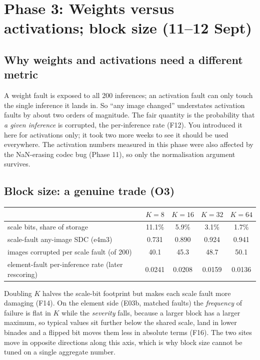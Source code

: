 \section{Phase 3: Weights versus activations; block size (11--12 Sept)}

\subsection{Why weights and activations need a different metric}
A weight fault is exposed to all 200 inferences; an activation fault can only touch the single inference it lands in. So ``any image changed'' understates activation faults by about two orders of magnitude. The fair quantity is the probability that \emph{a given inference} is corrupted, the per-inference rate (F12).
You introduced it here for activations only; it took two more weeks to see it should be used everywhere. The activation numbers measured in this phase were also affected by the NaN-erasing codec bug (Phase 11), so only the normalisation argument survives.

\subsection{Block size: a genuine trade (O3)}
\begin{center}
\small
\begin{tabular}{lcccc}
\toprule
 & $K=8$ & $K=16$ & $K=32$ & $K=64$ \\
\midrule
scale bits, share of storage & 11.1\% & 5.9\% & 3.1\% & 1.7\% \\
scale-fault any-image SDC (e4m3) & 0.731 & 0.890 & 0.924 & 0.941 \\
images corrupted per scale fault (of 200) & 40.1 & 45.3 & 48.7 & 50.1 \\
element-fault per-inference rate (later rescoring) & 0.0241 & 0.0208 & 0.0159 & 0.0136 \\
\bottomrule
\end{tabular}
\end{center}
Doubling $K$ halves the scale-bit footprint but makes each scale fault more damaging (F14). On the element side (E03b, matched faults) the \emph{frequency} of failure is flat in $K$ while the \emph{severity} falls, because a larger block has a larger maximum, so typical values sit further below the shared scale, land in lower binades and a flipped bit moves them less in absolute terms (F16).
The two sites move in opposite directions along this axis, which is why block size cannot be tuned on a single aggregate number.


